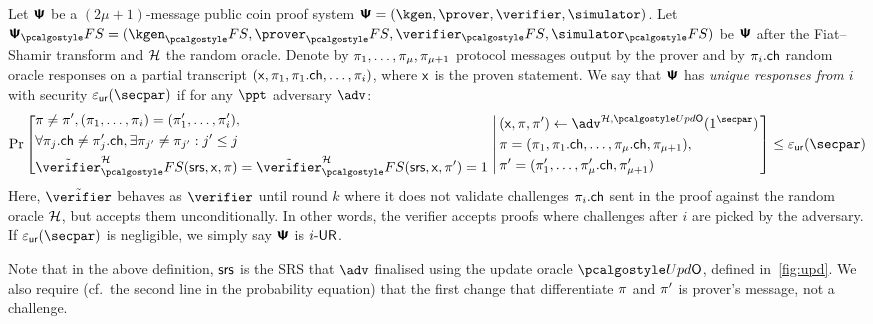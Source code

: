 \begin{definition}
	\label{def:wiuru}
	Let $\bm{\mathsf{\Psi}}$ be a $(2\mu + 1)$-message public coin proof system
  $\ps = (\kgen, \prover, \verifier, \simulator)$. Let
  $\proofsystem_\fs = (\kgen_\fs, \prover_\fs, \verifier_\fs, \simulator_\fs)$ be
  $\bm{\mathsf{\Psi}}$ after the Fiat--Shamir transform and $\mathcal{H}$ the random oracle. Denote
  by $\pi_1, \ldots, \pi_{\mu}, \pi_{\mu + 1}$ protocol messages
  output by the prover and by $\pi_i.\mathsf{ch}$ random oracle responses on a partial
  transcript
  $(\mathsf{x}, \pi_1, \pi_1.\mathsf{ch}, \ldots, \pi_i)$,
  where $\mathsf{x}$ is the proven statement. We say that $\bm{\mathsf{\Psi}}$ has \emph{unique
    responses from $i$} with security $\epsur(\secpar)$ if for any $\ppt$ adversary $\adv$:
  \[
	\Pr\left[
	\begin{aligned}
	& \zkproof \neq \zkproof', (\zkproof_1, \ldots, \zkproof_{i}) = (\zkproof'_1,
	\ldots, \zkproof'_{i}), \\
	& \forall \zkproof_{j}.\ch \neq \zkproof'_{j}.\ch, \exists \zkproof_{j'} \neq \zkproof_{j'}: j' \leq j\\
	& \tilde{\verifier}^{\ro}_\fs (\srs, \inp, \zkproof) =
	\tilde{\verifier}^{\ro}_\fs(\srs, \inp, \zkproof') = 1  \\
	\end{aligned}
	\,\left|\,
	\begin{aligned}
		& (\inp, \zkproof, \zkproof') \gets \adv^{\ro, \initU}(1^\secpar) \\
		& \zkproof = (\zkproof_1, \zkproof_1.\ch, \ldots, \zkproof_{\mu}.\ch, \zkproof_{\mu + 1}), \\
		& \zkproof' =  (\zkproof'_1, \ldots, \zkproof'_{\mu}.\ch, \zkproof'_{\mu + 1})
	\end{aligned}
	\right.\right] \leq \epsur(\secpar) 
	\]
	Here, $\tilde{\verifier}$ behaves as $\verifier$ until round $k$ where it does not validate challenges $\pi_i.\mathsf{ch}$ sent in the proof against the random oracle $\mathcal{H}$, but accepts them unconditionally. In other words, the verifier accepts proofs where challenges after $i$ are picked by the adversary. If $\epsur(\secpar)$ is negligible, we simply say $\bm{\mathsf{\Psi}}$ is ${i\text{-}\mathsf{UR}}$.
\end{definition}
%
Note that in the above definition, $\mathsf{srs}$ is the SRS that $\advse$ finalised using
the update oracle $\initU$, defined in~\cref{fig:upd}. We also require (cf.~the second line in the probability equation) that the first change that differentiate $\pi$ and $\pi'$ is prover's message, not a challenge. 

